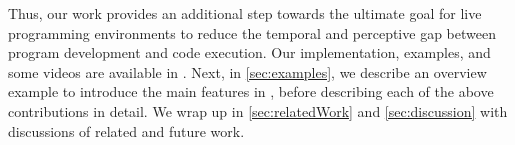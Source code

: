 
\vspace{5pt}

Thus, our work provides an additional step towards the ultimate goal for live
programming environments to reduce the temporal and perceptive gap between
program development and code execution.
%
Our implementation, examples, and some videos are available in \suppMaterials{}.
%
Next, in \autoref{sec:examples}, we describe an overview example to introduce
the main features in \HazelnutLive{}, before describing each of the above
contributions in detail.
%
We wrap up in \autoref{sec:relatedWork} and \autoref{sec:discussion} with
discussions of related and future work.


